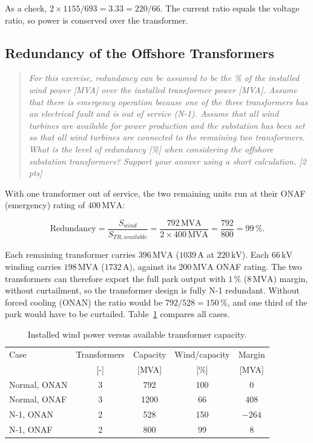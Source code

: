 As a check, $2 \times 1155 / 693 = 3.33 = 220/66$. The current ratio equals the voltage ratio, so power is conserved over the transformer.

\subsection{Redundancy of the Offshore Transformers}
\label{sec:elec-redundancy}
\begin{quote}
\emph{For this exercise, redundancy can be assumed to be the \% of the installed wind power [MVA] over the installed transformer power [MVA]. Assume that there is emergency operation because one of the three transformers has an electrical fault and is out of service (N-1). Assume that all wind turbines are available for power production and the substation has been set so that all wind turbines are connected to the remaining two transformers. What is the level of redundancy [\%] when considering the offshore substation transformers? Support your answer using a short calculation. [2 pts]}
\end{quote}

With one transformer out of service, the two remaining units run at their ONAF (emergency) rating of $400\,\mathrm{MVA}$:

\begin{equation}
    \text{Redundancy} = \frac{S_{wind}}{S_{TR,available}} = \frac{792\,\mathrm{MVA}}{2 \times 400\,\mathrm{MVA}} = \frac{792}{800} = 99\,\%.
    \label{eq:elec-redundancy}
\end{equation}

Each remaining transformer carries $396\,\mathrm{MVA}$ ($1039\,\mathrm{A}$ at $220\,\mathrm{kV}$). Each $66\,\mathrm{kV}$ winding carries $198\,\mathrm{MVA}$ ($1732\,\mathrm{A}$), against its $200\,\mathrm{MVA}$ ONAF rating. The two transformers can therefore export the full park output with $1\,\%$ ($8\,\mathrm{MVA}$) margin, without curtailment, so the transformer design is fully N-1 redundant. Without forced cooling (ONAN) the ratio would be $792/528 = 150\,\%$, and one third of the park would have to be curtailed. Table~\ref{tab:elec-red} compares all cases.

\begin{table}[H]
    \centering
    \caption{Installed wind power versus available transformer capacity.}
    \label{tab:elec-red}
    \begin{tabular}{lcccc}
        \hline
        Case & Transformers & Capacity & Wind/capacity & Margin \\
        & [-] & [MVA] & [\%] & [MVA] \\
        \hline
        Normal, ONAN & 3 & 792  & 100 & 0 \\
        Normal, ONAF & 3 & 1200 & 66  & 408 \\
        N-1, ONAN    & 2 & 528  & 150 & $-264$ \\
        N-1, ONAF    & 2 & 800  & 99  & 8 \\
        \hline
    \end{tabular}
\end{table}

